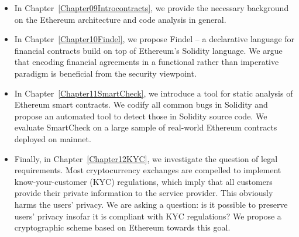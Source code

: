 \begin{itemize}
	\begin{itemize}
		\item 
	In Chapter~\ref{Chapter09Introcontracts}, we provide the necessary background on the Ethereum architecture and code analysis in general.
		\item
	In Chapter~\ref{Chapter10Findel}, we propose Findel -- a declarative language for financial contracts build on top of Ethereum's Solidity language.
	We argue that encoding financial agreements in a functional rather than imperative paradigm is beneficial from the security viewpoint.
		\item
	In Chapter~\ref{Chapter11SmartCheck}, we introduce a tool for static analysis of Ethereum smart contracts.
	We codify all common bugs in Solidity and propose an automated tool to detect those in Solidity source code.
	We evaluate SmartCheck on a large sample of real-world Ethereum contracts deployed on mainnet.
		\item
	Finally, in Chapter~\ref{Chapter12KYC}, we investigate the question of legal requirements.
	Most cryptocurrency exchanges are compelled to implement know-your-customer (KYC) regulations, which imply that all customers provide their private information to the service provider.
	This obviously harms the users' privacy.
	We are asking a question: is it possible to preserve users' privacy insofar it is compliant with KYC regulations?
	We propose a cryptographic scheme based on Ethereum towards this goal.
	
	\end{itemize}
\end{itemize}















